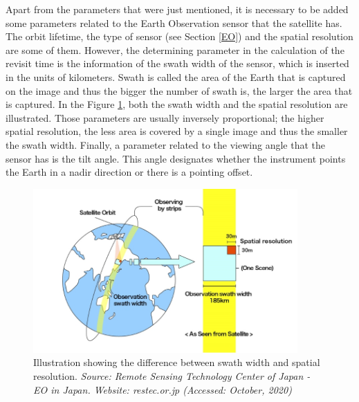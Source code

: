 
Apart from the parameters that were just mentioned, it is necessary to be added some parameters related to the Earth Observation sensor that the satellite has. The orbit lifetime, the type of sensor (see Section \ref{EO}) and the spatial resolution are some of them. However, the determining parameter in the calculation of the revisit time is the information of the swath width of the sensor, which is inserted in the units of kilometers. Swath is called the area of the Earth that is captured on the image and thus the bigger the number of swath is, the larger the area that is captured. In the Figure \ref{swath_width}, both the swath width and the spatial resolution are illustrated. Those parameters are usually inversely proportional; the higher spatial resolution, the less area is covered by a single image and thus the smaller the swath width. Finally, a parameter related to the viewing angle that the sensor has is the tilt angle. This angle designates whether the instrument points the Earth in a nadir direction or there is a pointing offset. 

\begin{figure}
\centering
\includegraphics[width=0.9\textwidth]{Images/swath_width.png}\caption{Illustration showing the difference between swath width and spatial resolution. \textit{Source: Remote Sensing Technology Center of Japan - EO in Japan. Website: restec.or.jp (Accessed: October, 2020)}} %
\label{swath_width} 
\end{figure}

